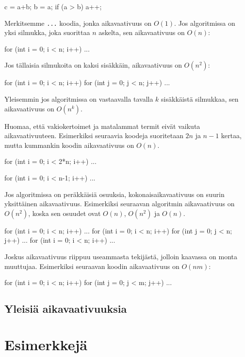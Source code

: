 \begin{code}
c = a+b;
b = a;
if (a > b) a++;
\end{code}

Merkitsemme \texttt{...} koodia,
jonka aikavaativuus on $O(1)$.
Jos algoritmissa on yksi silmukka,
joka suorittaa $n$ askelta,
sen aikavaativuus on $O(n)$:

\begin{code}
for (int i = 0; i < n; i++) {
    ...
}
\end{code}

Jos tällaisia silmukoita on kaksi sisäkkäin,
aikavaativuus on $O(n^2)$:

\begin{code}
for (int i = 0; i < n; i++) {
    for (int j = 0; j < n; j++) {
        ...
    }
}
\end{code}

Yleisemmin jos algoritmissa on vastaavalla tavalla
$k$ sisäkkäistä silmukkaa,
sen aikavaativuus on $O(n^k)$.

Huomaa, että vakiokertoimet ja matalammat termit eivät vaikuta aikavaativuuteen.
Esimerkiksi seuraavia koodeja suoritetaan $2n$ ja $n-1$ kertaa,
mutta kummankin koodin aikavaativuus on $O(n)$.

\begin{code}
for (int i = 0; i < 2*n; i++) {
    ...
}
\end{code}

\begin{code}
for (int i = 0; i < n-1; i++) {
    ...
}
\end{code}

Jos algoritmissa on peräkkäisiä osuuksia, kokonaisaikavaativuus on suurin
yksittäinen aikavaativuus. Esimerkiksi seuraavan algoritmin aikavaativuus on $O(n^2)$,
koska sen osuudet ovat $O(n)$, $O(n^2)$ ja $O(n)$.

\begin{code}
for (int i = 0; i < n; i++) {
    ...
}
for (int i = 0; i < n; i++) {
    for (int j = 0; j < n; j++) {
        ...
    }
}
for (int i = 0; i < n; i++) {
    ...
}
\end{code}

Joskus aikavaativuus riippuu useammasta tekijästä,
jolloin kaavassa on monta muuttujaa.
Esimerkiksi seuraavan koodin aikavaativuus on $O(nm)$:

\begin{code}
for (int i = 0; i < n; i++) {
    for (int j = 0; j < m; j++) {
        ...
    }
}
\end{code}

\subsection{Yleisiä aikavaativuuksia}

\section{Esimerkkejä}
